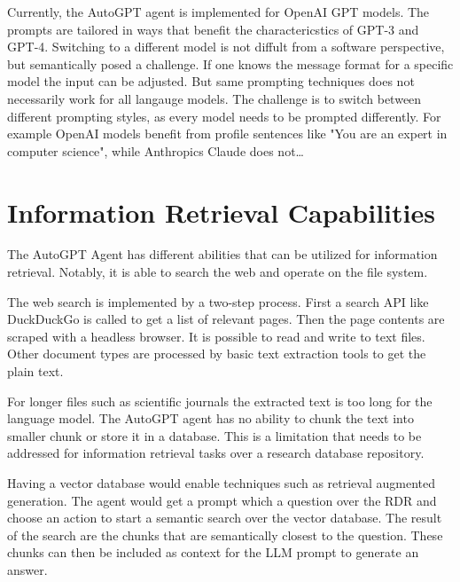 \documentclass[english, version-2022-01]{uzl-thesis}
\begin{document}

Currently, the AutoGPT agent is implemented for OpenAI GPT models. 
The prompts are tailored in ways that benefit the charactericstics of GPT-3 and GPT-4.
Switching to a different model is not diffult from a software perspective, but semantically posed a challenge. 
If one knows the message format for a specific model the input can be adjusted.
But same prompting techniques does not necessarily work for all langauge models.
The challenge is to switch between different prompting styles, as every model needs to be prompted differently.
For example OpenAI models benefit from profile sentences like "You are an expert in computer science", while Anthropics Claude does not\dots

\section{Information Retrieval Capabilities}

The AutoGPT Agent has different abilities that can be utilized for information retrieval.
Notably, it is able to search the web and operate on the file system.

The web search is implemented by a two-step process.
First a search API like DuckDuckGo is called to get a list of relevant pages.
Then the page contents are scraped with a headless browser.
It is possible to read and write to text files.
Other document types are processed by basic text extraction tools to get the plain text.

For longer files such as scientific journals the extracted text is too long for the language model.
The AutoGPT agent has no ability to chunk the text into smaller chunk or store it in a database.
This is a limitation that needs to be addressed for information retrieval tasks over a research database repository.

Having a vector database would enable techniques such as retrieval augmented generation.
The agent would get a prompt which a question over the RDR and choose an action to start a semantic search over the vector database.
The result of the search are the chunks that are semantically closest to the question.
These chunks can then be included as context for the LLM prompt to generate an answer.
\end{document}
